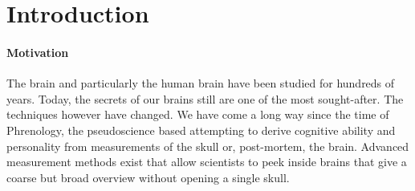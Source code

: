 \documentclass[a4paper, 10pt, english, twocolumn]{article}
\title{\fontfamily{phv}\selectfont{Causal Discovery methods for Effective Connectivity}}
\author{
  \textbf{R. Janssen} - \href{mailto:ramon.janssen@student.ru.nl}{ramon.janssen@student.ru.nl} \\
  \textbf{T. de Ruijter} - \href{mailto:t.deruijter@student.ru.nl}{t.deruijter@student.ru.nl}\\
  \textbf{T. Claassen} - \href{mailto:tomc@cs.ru.nl}{tomc@cs.ru.nl}\\
  \textbf{M. Hinne} - \href{mailto:mhinne@cs.ru.nl}{mhinne@cs.ru.nl}
}
\date{\fontfamily{ptm}\selectfont{\small{\bfseries{\today - Radboud
Universiteit Nijmegen}}}\\[0.5cm]\rule{\linewidth}{0.3mm}}
\newcommand{\keywords}[1]{\par\noindent 
{\bf Keywords\/}. #1}
\begin{document}
\maketitle

\begin{abstract}
We propose a new application for causal discovery methods on human brain networks in order to derive effective connectivity.
The directive nature of effective brain networks suggest causal methods can be used.
As current methods for effective connectivity suffer from computational difficulties and often cannot cope with latent variables, we propose an application of PC-algorithm and the Bayesian BCCD-algorithm \cite{claassen2012} to estimate effective connectivity.
Both methods will be applied on six healthy subjects of which fMRI data and structural networks are readily available.
\keywords{Effective connectivity, Causal Discovery}
\end{abstract}

\setlength{\parindent}{0.0cm}
\setlength{\parskip}{0.25cm}

\section{Introduction}


\paragraph{Motivation}
The brain and particularly the human brain have been studied for hundreds of years.
Today, the secrets of our brains still are one of the most sought-after.
The techniques however have changed.
We have come a long way since the time of Phrenology, the pseudoscience based attempting to derive cognitive ability and personality from measurements of the skull or, post-mortem, the brain.
Advanced measurement methods exist that allow scientists to peek inside brains that give a coarse but broad overview without opening a single skull.
\end{document}
